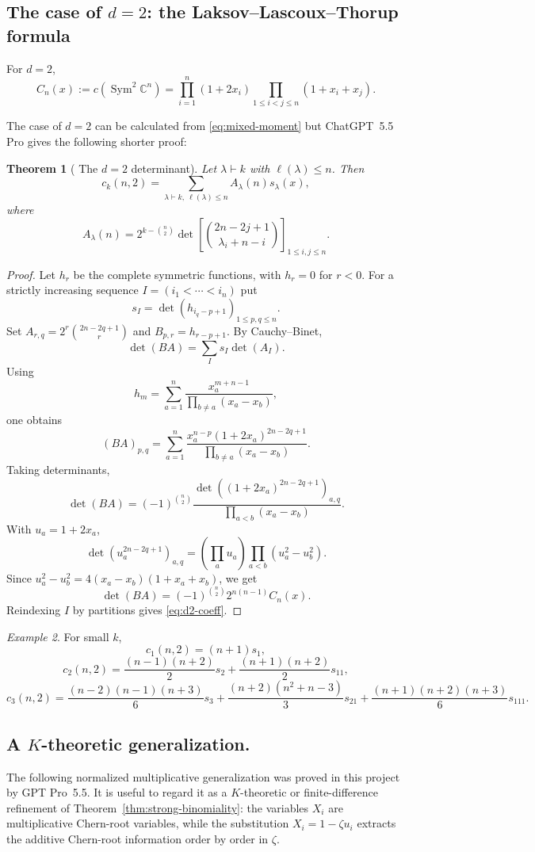 \documentclass[11pt]{amsart}
\numberwithin{equation}{section}
\newtheorem{theorem}{Theorem}[section]
\theoremstyle{remark}
\newtheorem{example}[theorem]{Example}
\DeclareMathOperator{\Sym}{Sym}
\newcommand{\C}{\mathbb C}
\begin{document}
\subsection{The case of $d=2$: the Laksov--Lascoux--Thorup formula}
\smallskip

For $d=2$,
\[
  C_n(x):=c(\Sym^2\C^n)=\prod_{i=1}^n(1+2x_i)\prod_{1\le i<j\le n}(1+x_i+x_j).
\]

The case of $d=2$ can be calculated from \eqref{eq:mixed-moment} but ChatGPT~5.5 Pro gives the following shorter proof:



\begin{theorem}[ \cite{LLT} The $d=2$ determinant]\label{thm:d2det}
Let $\lambda\vdash k$ with $\ell(\lambda)\le n$.  Then
\[
  c_k(n,2)=\sum_{\lambda\vdash k,\ \ell(\lambda)\le n}A_\lambda(n)s_\lambda(x),
\]
where
\begin{equation}\label{eq:d2-coeff}
  A_\lambda(n)=2^{k-\binom n2}
  \det\left[\binom{2n-2j+1}{\lambda_i+n-i}\right]_{1\le i,j\le n}.
\end{equation}
\end{theorem}

\begin{proof}
Let $h_r$ be the complete symmetric functions, with $h_r=0$ for $r<0$.  For a strictly increasing sequence $I=(i_1<\cdots<i_n)$ put
\[
  s_I=\det(h_{i_q-p+1})_{1\le p,q\le n}.
\]
Set $A_{r,q}=2^r\binom{2n-2q+1}{r}$ and $B_{p,r}=h_{r-p+1}$.  By Cauchy--Binet,
\[
  \det(BA)=\sum_I s_I\det(A_I).
\]
Using
\[
  h_m=\sum_{a=1}^n \frac{x_a^{m+n-1}}{\prod_{b\ne a}(x_a-x_b)},
\]
one obtains
\[
  (BA)_{p,q}=\sum_{a=1}^n
  \frac{x_a^{n-p}(1+2x_a)^{2n-2q+1}}{\prod_{b\ne a}(x_a-x_b)}.
\]
Taking determinants,
\[
  \det(BA)=(-1)^{\binom n2}
  \frac{\det((1+2x_a)^{2n-2q+1})_{a,q}}{\prod_{a<b}(x_a-x_b)}.
\]
With $u_a=1+2x_a$,
\[
  \det(u_a^{2n-2q+1})_{a,q}
  =\left(\prod_a u_a\right)\prod_{a<b}(u_a^2-u_b^2).
\]
Since $u_a^2-u_b^2=4(x_a-x_b)(1+x_a+x_b)$, we get
\[
  \det(BA)=(-1)^{\binom n2}2^{n(n-1)}C_n(x).
\]
Reindexing $I$ by partitions gives \eqref{eq:d2-coeff}.
\end{proof}

\begin{example}
For small $k$,
\[
  c_1(n,2)=(n+1)s_1,
\]
\[
  c_2(n,2)=\frac{(n-1)(n+2)}2s_2+\frac{(n+1)(n+2)}2s_{11},
\]
\[
  c_3(n,2)=\frac{(n-2)(n-1)(n+3)}6s_3+
  \frac{(n+2)(n^2+n-3)}3s_{21}
  +\frac{(n+1)(n+2)(n+3)}6s_{111}.
\]
\end{example}

\medskip
\subsection{A $K$-theoretic generalization.}
The following normalized multiplicative generalization
was proved in this project by GPT Pro~5.5.  It is useful to regard it as a $K$-theoretic or finite-difference refinement of Theorem~\ref{thm:strong-binomiality}: the variables $X_i$ are multiplicative Chern-root variables, while the substitution $X_i=1-\zeta u_i$ extracts the additive Chern-root information order by order in $\zeta$.
\end{document}
